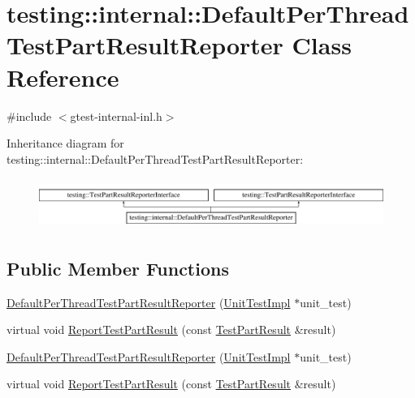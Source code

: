 \hypertarget{classtesting_1_1internal_1_1_default_per_thread_test_part_result_reporter}{\section{testing\-:\-:internal\-:\-:Default\-Per\-Thread\-Test\-Part\-Result\-Reporter Class Reference}
\label{classtesting_1_1internal_1_1_default_per_thread_test_part_result_reporter}
}


{\ttfamily \#include $<$gtest-\/internal-\/inl.\-h$>$}

Inheritance diagram for testing\-:\-:internal\-:\-:Default\-Per\-Thread\-Test\-Part\-Result\-Reporter\-:\begin{figure}[H]
\begin{center}
\leavevmode
\includegraphics[height=1.651917cm]{classtesting_1_1internal_1_1_default_per_thread_test_part_result_reporter}
\end{center}
\end{figure}
\subsection*{Public Member Functions}
\begin{DoxyCompactItemize}
\item 
\hyperlink{classtesting_1_1internal_1_1_default_per_thread_test_part_result_reporter_a968a846e5a90d2ffea8b2ce2746099bd}{Default\-Per\-Thread\-Test\-Part\-Result\-Reporter} (\hyperlink{classtesting_1_1internal_1_1_unit_test_impl}{Unit\-Test\-Impl} $\ast$unit\-\_\-test)
\item 
virtual void \hyperlink{classtesting_1_1internal_1_1_default_per_thread_test_part_result_reporter_ac6dc08eadc4e5a2a64a91d0b6c6b3aad}{Report\-Test\-Part\-Result} (const \hyperlink{classtesting_1_1_test_part_result}{Test\-Part\-Result} \&result)
\item 
\hyperlink{classtesting_1_1internal_1_1_default_per_thread_test_part_result_reporter_a968a846e5a90d2ffea8b2ce2746099bd}{Default\-Per\-Thread\-Test\-Part\-Result\-Reporter} (\hyperlink{classtesting_1_1internal_1_1_unit_test_impl}{Unit\-Test\-Impl} $\ast$unit\-\_\-test)
\item 
virtual void \hyperlink{classtesting_1_1internal_1_1_default_per_thread_test_part_result_reporter_a7e1f4fa56b88fc4f07c75eedc2ca3013}{Report\-Test\-Part\-Result} (const \hyperlink{classtesting_1_1_test_part_result}{Test\-Part\-Result} \&result)
\end{DoxyCompactItemize}


